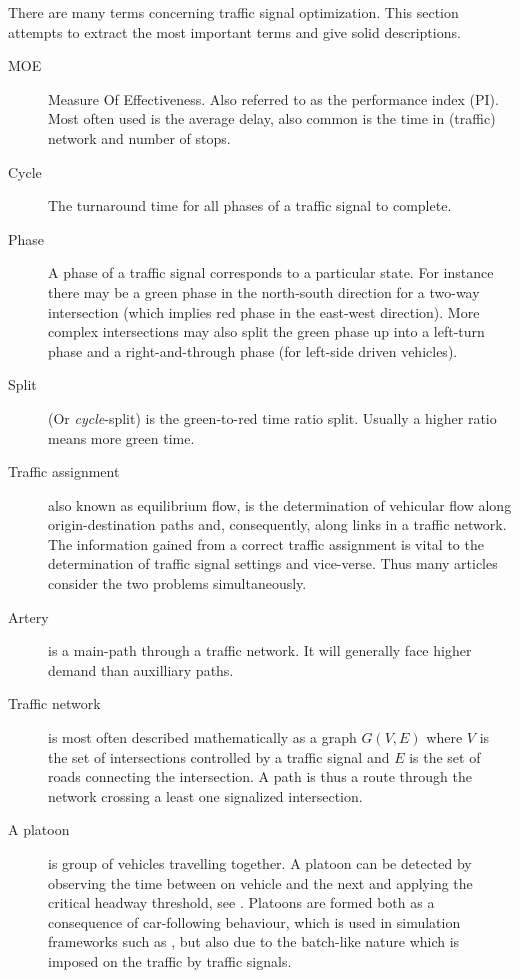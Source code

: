 \label{vocabulary}
There are many terms concerning traffic signal optimization. This section attempts to extract the most important terms and give solid descriptions.


\begin{description}
	\item[MOE] Measure Of Effectiveness. Also referred to as the performance index (PI).
	Most often used is the average delay, also common is the time in (traffic) network and number of stops. 
			
	\item[Cycle] The turnaround time for all phases of a traffic signal to complete.
	
	\item[Phase] A phase of a traffic signal corresponds to a particular state. 
	For instance there may be a green phase in the north-south direction for a two-way intersection (which implies red phase in the east-west direction).
	More complex intersections may also split the green phase up into a left-turn phase and a right-and-through phase (for left-side driven vehicles).
	
	\item[Split] (Or \textit{cycle}-split) is the green-to-red time ratio split. Usually a higher ratio means more green time.
	
	\item[Traffic assignment] also known as equilibrium flow, is the determination of vehicular flow along origin-destination paths and, consequently, along links in a traffic network. The information gained from a correct traffic assignment is vital to the determination of traffic signal settings and vice-verse. Thus many articles consider the two problems simultaneously.

\item[Artery] is a main-path through a traffic network. It will generally face higher demand than auxilliary paths.

\item[Traffic network] is most often described mathematically as a graph $G(V,E)$ where $V$ is the set of intersections controlled by a traffic signal and $E$ is the set of roads connecting the intersection. A path is thus a route through the network crossing a least one signalized intersection.

	\item[A platoon] is group of vehicles travelling together. A platoon can be detected by observing the time between on vehicle and the next and applying the critical headway threshold, see \cite[sct. 2]{25}. 
Platoons are formed both as a consequence of car-following behaviour, which is used in simulation frameworks such as \cite{treiber-2000-62}, but also due to the batch-like nature which is imposed on the traffic by traffic signals.
\end{description}
